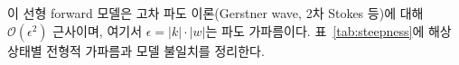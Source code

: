 \documentclass[11pt]{report}
\numberwithin{equation}{chapter}
\numberwithin{figure}{chapter}
\numberwithin{table}{chapter}
\begin{document}
이 선형 forward 모델은 고차 파도 이론(Gerstner wave, 2차 Stokes 등)에 대해
$\mathcal{O}(\epsilon^2)$ 근사이며, 여기서 $\epsilon = |k| \cdot |w|$는 파도 가파름이다.
표~\ref{tab:steepness}에 해상 상태별 전형적 가파름과 모델 불일치를 정리한다.

\begin{table}[htbp]
\centering
\caption{해상 상태별 파도 가파름과 선형 모델 불일치(해석적 추정).
$\epsilon = |k_p| \cdot H_s/2$는 피크 파수 $k_p$에서의 가파름.
\textbf{[범위] (2026-08-14):} 이 표는 \emph{실제 바다}에서 기대되는 불일치의 해석적
추정이며, \textbf{본 논문의 \emph{선형} 합성 코퍼스에는 적용되지 않는다} --- 그 코퍼스에서
ground truth는 변위 없는 선형 중첩이므로 실측 불일치가 0이다(제3장 시뮬레이션 절 참조).
★\textbf{[2026-09-03]} 비선형 HOS 코퍼스는 다르다 --- 본문의 \texttt{C1}$\cdot$\texttt{C1c} 참조.}
\label{tab:steepness}

\end{table}
\end{document}
